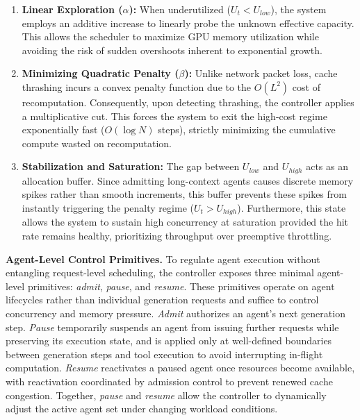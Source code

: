 \begin{enumerate}[leftmargin=*, nosep]
    \item[(1)] \textbf{Linear Exploration ($\alpha$):} 
    When underutilized ($U_t < U_{low}$), the system employs an additive increase to linearly probe the unknown effective capacity. This allows the scheduler to maximize GPU memory utilization while avoiding the risk of sudden overshoots inherent to exponential growth.

    \item[(2)] \textbf{Minimizing Quadratic Penalty ($\beta$):} 
    Unlike network packet loss, cache thrashing incurs a convex penalty function due to the $O(L^2)$ cost of recomputation. Consequently, upon detecting thrashing, the controller applies a multiplicative cut. This forces the system to exit the high-cost regime exponentially fast ($O(\log N)$ steps), strictly minimizing the cumulative compute wasted on recomputation.

    \item[(3)] \textbf{Stabilization and Saturation:}
     The gap between $U_{low}$ and $U_{high}$ acts as an allocation buffer. Since admitting long-context agents causes discrete memory spikes rather than smooth increments, this buffer prevents these spikes from instantly triggering the penalty regime ($U_{t} > U_{high}$). Furthermore, this state allows the system to sustain high concurrency at saturation provided the hit rate remains healthy, prioritizing throughput over preemptive throttling.
   
\end{enumerate}


\noindent\textbf{Agent-Level Control Primitives.}
To regulate agent execution without entangling request-level scheduling, the controller exposes three minimal agent-level primitives: \emph{admit}, \emph{pause}, and \emph{resume}. These primitives operate on agent lifecycles rather than individual generation requests and suffice to control concurrency and memory pressure. \emph{Admit} authorizes an agent’s next generation step. \emph{Pause} temporarily suspends an agent from issuing further requests while preserving its execution state, and is applied only at well-defined boundaries between generation steps and tool execution to avoid interrupting in-flight computation. \emph{Resume} reactivates a paused agent once resources become available, with reactivation coordinated by admission control to prevent renewed cache congestion. Together, \emph{pause} and \emph{resume} allow the controller to dynamically adjust the active agent set under changing workload conditions.
